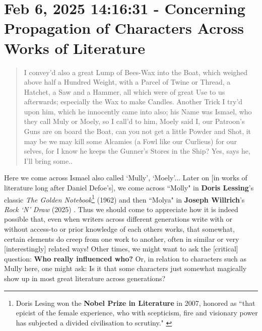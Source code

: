 \documentclass[a4paper]{article}
\begin{document}
\section{Feb 6, 2025 14:16:31 - Concerning Propagation of Characters Across Works of Literature}
\label{SEC8}

\noindent
\begin{minipage}{1\textwidth}
\vspace{1em}
\begin{quotation}
{\ttfamily

I convey’d also a great Lump of Bees-Wax into the Boat, which weighed above half a Hundred Weight, with a Parcel of Twine or Thread, a Hatchet, a Saw and a Hammer, all which were of great Use to us afterwards; especially the Wax to make Candles. Another Trick I try’d upon him, which he innocently came into also; his Name was Ismael, who they call Muly or Moely, so I call’d to him, Moely said I, our Patroon’s Guns are on board the Boat, can you not get a little Powder and Shot, it may be we may kill some Alcamies (a Fowl like our Curlieus) for our selves, for I know he keeps the Gunner’s Stores in the Ship? Yes, says he, I’ll bring some..

}
\end{quotation}
\vspace{1em}
\end{minipage}


Here we come across Ismael also called `Mully', `Moely'... Later on [in works of literature long after Daniel Defoe's], we come across ``Molly" in \textbf{Doris Lessing}'s classic \textit{The Golden Notebook}\footnote{Doris Lesing won the \textbf{Nobel Prize in Literature} in 2007, honored as ``that epicist of the female experience, who with scepticism, fire and visionary power has subjected a divided civilisation to scrutiny." \cite{copilot_assistant}} (1962) and then ``Molya" in \textbf{Joseph Willrich}'s \textit{Rock `N' Draw} (2025) \cite{lutalo2025rock}. Thus we should come to appreciate how it is indeed possible that, even when writers across different generations write with or without access-to or prior knowledge of each others works, that somewhat, certain elements do creep from one work to another, often in similar or very [interestingly] related ways! Other times, we might want to ask the [critical] question: \textbf{Who really influenced who?} Or, in relation to characters such as Mully here, one might ask: Is it that some characters just somewhat magically show up in most great literature across generations?
\end{document}
